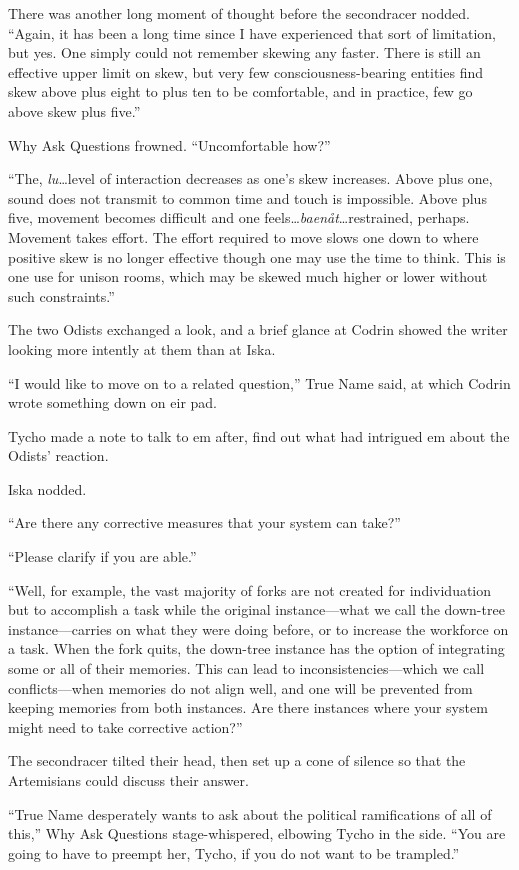 There was another long moment of thought before the secondracer nodded. ``Again, it has been a long time since I have experienced that sort of limitation, but yes. One simply could not remember skewing any faster. There is still an effective upper limit on skew, but very few consciousness-bearing entities find skew above plus eight to plus ten to be comfortable, and in practice, few go above skew plus five.''

Why Ask Questions frowned. ``Uncomfortable how?''

``The, \emph{lu}\ldots level of interaction decreases as one's skew increases. Above plus one, sound does not transmit to common time and touch is impossible. Above plus five, movement becomes difficult and one feels\ldots{}\emph{baenåt}\ldots restrained, perhaps. Movement takes effort. The effort required to move slows one down to where positive skew is no longer effective though one may use the time to think. This is one use for unison rooms, which may be skewed much higher or lower without such constraints.''

The two Odists exchanged a look, and a brief glance at Codrin showed the writer looking more intently at them than at Iska.

``I would like to move on to a related question,'' True Name said, at which Codrin wrote something down on eir pad.

Tycho made a note to talk to em after, find out what had intrigued em about the Odists' reaction.

Iska nodded.

``Are there any corrective measures that your system can take?''

``Please clarify if you are able.''

``Well, for example, the vast majority of forks are not created for individuation but to accomplish a task while the original instance—what we call the down-tree instance—carries on what they were doing before, or to increase the workforce on a task. When the fork quits, the down-tree instance has the option of integrating some or all of their memories. This can lead to inconsistencies—which we call conflicts—when memories do not align well, and one will be prevented from keeping memories from both instances. Are there instances where your system might need to take corrective action?''

The secondracer tilted their head, then set up a cone of silence so that the Artemisians could discuss their answer.

``True Name desperately wants to ask about the political ramifications of all of this,'' Why Ask Questions stage-whispered, elbowing Tycho in the side. ``You are going to have to preempt her, Tycho, if you do not want to be trampled.''

